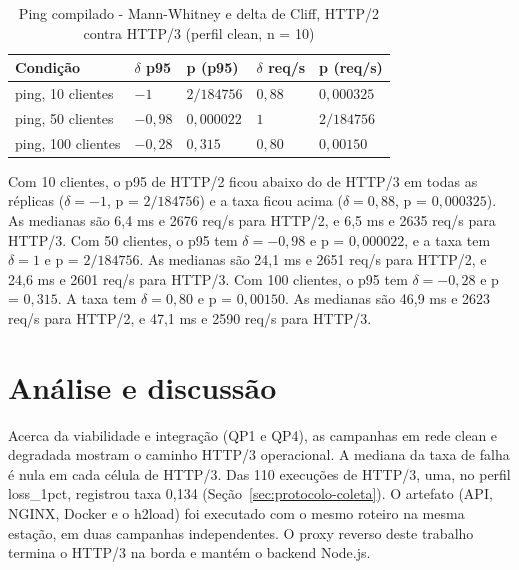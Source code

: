 \begin{table}[H]
\centering
\caption[Ping compilado - Mann-Whitney e delta de Cliff, HTTP/2 contra HTTP/3]{Ping compilado - Mann-Whitney e delta de Cliff, HTTP/2 contra HTTP/3 (perfil clean, n = 10)}\label{tab:mann-whitney-ping-compilado}
\footnotesize
\setlength{\tabcolsep}{3pt}
\begin{tabular}{@{}>{\raggedright\arraybackslash}p{36mm}>{\centering\arraybackslash}p{18mm}>{\centering\arraybackslash}p{28mm}>{\centering\arraybackslash}p{20mm}>{\centering\arraybackslash}p{28mm}@{}} \hline
\textbf{Condição} & \textbf{$\delta$ p95} & \textbf{p (p95)} & \textbf{$\delta$ req/s} & \textbf{p (req/s)} \\
\hline
ping, 10 clientes & $-1$ & $2/184756$ & $0{,}88$ & $0{,}000325$ \\
ping, 50 clientes & $-0{,}98$ & $0{,}000022$ & $1$ & $2/184756$ \\
ping, 100 clientes & $-0{,}28$ & $0{,}315$ & $0{,}80$ & $0{,}00150$ \\
\hline
\end{tabular}
\end{table}

Com 10 clientes, o p95 de HTTP/2 ficou abaixo do de HTTP/3 em todas as réplicas ($\delta = -1$, p = $2/184756$) e a taxa ficou acima ($\delta = 0{,}88$, p = $0{,}000325$). As medianas são 6,4 ms e 2676 req/s para HTTP/2, e 6,5 ms e 2635 req/s para HTTP/3. Com 50 clientes, o p95 tem $\delta = -0{,}98$ e p = $0{,}000022$, e a taxa tem $\delta = 1$ e p = $2/184756$. As medianas são 24,1 ms e 2651 req/s para HTTP/2, e 24,6 ms e 2601 req/s para HTTP/3. Com 100 clientes, o p95 tem $\delta = -0{,}28$ e p = $0{,}315$. A taxa tem $\delta = 0{,}80$ e p = $0{,}00150$. As medianas são 46,9 ms e 2623 req/s para HTTP/2, e 47,1 ms e 2590 req/s para HTTP/3.

\section{Análise e discussão}\label{sec:analise-discussao}

Acerca da viabilidade e integração (QP1 e QP4), as campanhas em rede clean e degradada mostram o caminho HTTP/3 operacional. A mediana da taxa de falha é nula em cada célula de HTTP/3. Das 110 execuções de HTTP/3, uma, no perfil loss\_1pct, registrou taxa 0,134 (Seção~\ref{sec:protocolo-coleta}). O artefato (API, NGINX, Docker e o h2load) foi executado com o mesmo roteiro na mesma estação, em duas campanhas independentes. O proxy reverso deste trabalho termina o HTTP/3 na borda e mantém o backend Node.js.

